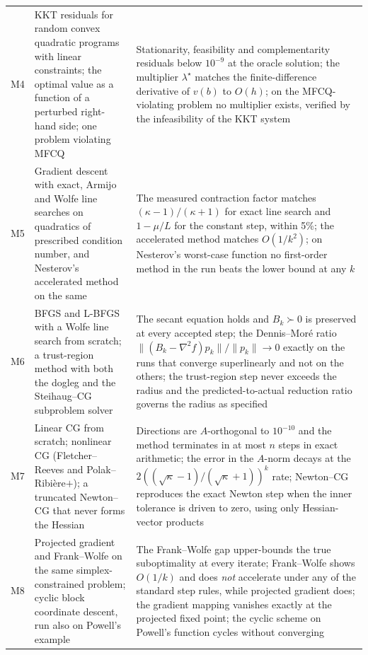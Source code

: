 \documentclass[11pt,a4paper]{article}
\begin{document}
\begin{longtable}{@{}L{0.9cm} L{6.2cm} L{7.3cm}@{}}
M4 & KKT residuals for random convex quadratic programs with linear constraints; the optimal
     value as a function of a perturbed right-hand side; one problem violating MFCQ
   & Stationarity, feasibility and complementarity residuals below $10^{-9}$ at the oracle
     solution; the multiplier $\lambda^\star$ matches the finite-difference derivative of
     $v(b)$ to $O(h)$; on the MFCQ-violating problem no multiplier exists, verified by the
     infeasibility of the KKT system \\

M5 & Gradient descent with exact, Armijo and Wolfe line searches on quadratics of prescribed
     condition number, and Nesterov's accelerated method on the same
   & The measured contraction factor matches $(\kappa-1)/(\kappa+1)$ for exact line search
     and $1-\mu/L$ for the constant step, within 5\%; the accelerated method matches
     $O(1/k^2)$; on Nesterov's worst-case function no first-order method in the run beats the
     lower bound at any $k$ \\

M6 & BFGS and L-BFGS with a Wolfe line search from scratch; a trust-region method with both
     the dogleg and the Steihaug--CG subproblem solver
   & The secant equation holds and $B_k \succ 0$ is preserved at every accepted step; the
     Dennis--Mor\'e ratio $\|(B_k-\nabla^2 f)p_k\|/\|p_k\| \to 0$ exactly on the runs that
     converge superlinearly and not on the others; the trust-region step never exceeds the
     radius and the predicted-to-actual reduction ratio governs the radius as specified \\

M7 & Linear CG from scratch; nonlinear CG (Fletcher--Reeves and Polak--Ribi\`ere$+$); a
     truncated Newton--CG that never forms the Hessian
   & Directions are $A$-orthogonal to $10^{-10}$ and the method terminates in at most $n$
     steps in exact arithmetic; the error in the $A$-norm decays at the
     $2((\sqrt\kappa-1)/(\sqrt\kappa+1))^k$ rate; Newton--CG reproduces the exact Newton step
     when the inner tolerance is driven to zero, using only Hessian-vector products \\

M8 & Projected gradient and Frank--Wolfe on the same simplex-constrained problem; cyclic
     block coordinate descent, run also on Powell's example
   & The Frank--Wolfe gap upper-bounds the true suboptimality at every iterate; Frank--Wolfe
     shows $O(1/k)$ and does \emph{not} accelerate under any of the standard step rules,
     while projected gradient does; the gradient mapping vanishes exactly at the projected
     fixed point; the cyclic scheme on Powell's function cycles without converging \\


\end{longtable}
\end{document}
